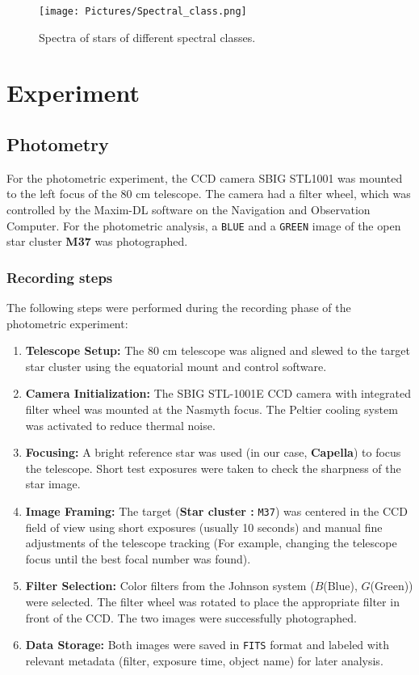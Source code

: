 \documentclass[12pt,a4paper]{article}
\begin{document}
    \begin{figure}[H]
      \centering
      \texttt{[image: Pictures/Spectral\_class.png]}
      \caption{Spectra of stars of different spectral classes.}
      \label{fig:spec_class}
    \end{figure}
\section{Experiment} 
\label{sec:experiment}
\subsection{Photometry}
For the photometric experiment, the CCD camera SBIG STL1001 was mounted to
the left focus of the 80 cm telescope. The camera had a filter wheel, which was controlled by the Maxim-DL software on the Navigation and Observation Computer.
For the photometric analysis, a \texttt{BLUE} and a \texttt{GREEN} image of the open star cluster \textbf{M37} was photographed.
\subsubsection{Recording steps}
The following steps were performed during the recording phase of the photometric experiment:

\begin{enumerate}
    \item \textbf{Telescope Setup:} The 80 cm telescope was aligned and slewed to the target star cluster using the equatorial mount and control software.
    
    \item \textbf{Camera Initialization:} The SBIG STL-1001E CCD camera with integrated filter wheel was mounted at the Nasmyth focus. The Peltier cooling system was activated to reduce thermal noise.
    
    \item \textbf{Focusing:} A bright reference star was used (in our case, \textbf{Capella}) to focus the telescope. Short test exposures were taken to check the sharpness of the star image.
    
    \item \textbf{Image Framing:} The target (\textbf{Star cluster :} \texttt{M37}) was centered in the CCD field of view using short exposures (usually 10 seconds) and manual fine adjustments of the telescope tracking (For example, changing the telescope focus until the best focal number was found).
    
    \item \textbf{Filter Selection:} Color filters from the Johnson system ($B$(Blue), $G$(Green)) were selected. The filter wheel was rotated to place the appropriate filter in front of the CCD. The two images were successfully photographed.
    
    \item \textbf{Data Storage:} Both images were saved in \texttt{FITS} format and labeled with relevant metadata (filter, exposure time, object name) for later analysis.
\end{enumerate}
\end{document}
